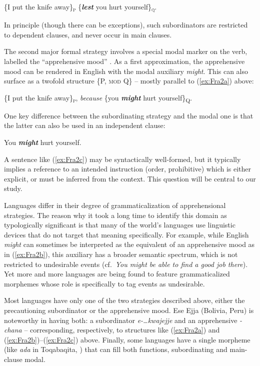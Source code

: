 \documentclass[output=paper,colorlinks,citecolor=brown]{langscibook}
\begin{document}
\ea \label{ex:Fra2a}
\textnormal{\{}I put the knife away\textnormal{\}}\textnormal{\textsc{\textsubscript{p}}} \textnormal{\{}\textbf{\textit{lest}} you hurt yourself\textnormal{\}}\textnormal{\textsc{\textsubscript{q}}}.
\z

\noindent In principle (though there can be exceptions), such subordinators are restricted to dependent clauses, and never occur in main clauses.

The second major formal strategy involves a special modal marker on the verb, labelled the ``apprehensive mood'' \citep{chapters/introduction}. As a first approximation, the apprehensive mood can be rendered in English with the modal auxiliary \textit{might}. This can also surface as a twofold structure \{P, \textsc{mod} Q\} -- mostly parallel to (\ref{ex:Fra2a}) above:
 
\ea \label{ex:Fra2b}
    \textnormal{\{}I put the knife away\textnormal{\}\textsc{\textsubscript{p}}}, {\op}\textit{because}{\cp}  \textnormal{\{}you \textbf{\textit{might}} hurt yourself\textnormal{\}\textsc{\textsubscript{Q}}}.
\z
 
One key difference between the subordinating strategy and the modal one is that the latter can also be used in an independent clause:
 
\ea \label{ex:Fra2c}
You \textbf{\textit{might}} hurt yourself.
\z

\noindent A sentence like (\ref{ex:Fra2c}) may be syntactically well-formed, but it typically implies a reference to an intended instruction (order, prohibitive) which is either explicit, or must be inferred from the context. This question will be central to our study.

Languages differ in their degree of grammaticalization of apprehensional strategies. The reason why it took a long time to identify this domain as typologically significant is that many of the world's languages use linguistic devices that do not target that meaning specifically. For example, while English \textit{might} can sometimes be interpreted as the equivalent of an apprehensive mood as in (\ref{ex:Fra2b}), this auxiliary has a broader semantic spectrum, which is not restricted to undesirable events (cf.\ \textit{You might be able to find a good job there}). Yet more and more languages are being found to feature grammaticalized morphemes whose role is specifically to tag events as undesirable. 

Most languages have only one of the two strategies described above, either the precautioning subordinator or the apprehensive mood. Ese Ejja (Bolivia, Peru) is noteworthy in having both: a subordinator \textit{e-\ldots kwajejje} and an apprehensive \textit{\nobreakdash-chana} \citep{vuillermet2018a} -- corresponding, respectively, to structures like (\ref{ex:Fra2a}) and (\ref{ex:Fra2b})--(\ref{ex:Fra2c}) above. Finally, some languages have a single morpheme (like \textit{ada} in Toqa\-baqita, \citealt{lichtenberk1995}) that can fill both functions, subordinating and main-clause modal.
 
\end{document}
